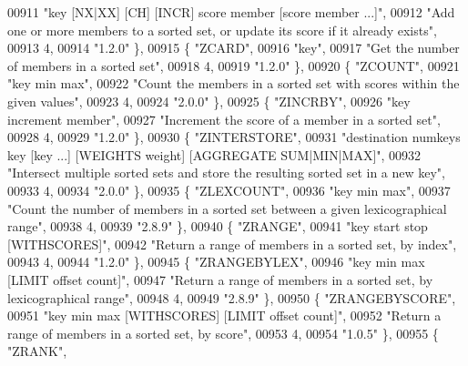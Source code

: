 \begin{DoxyCode}
00911     \textcolor{stringliteral}{"key [NX|XX] [CH] [INCR] score member [score member ...]"},
00912     \textcolor{stringliteral}{"Add one or more members to a sorted set, or update its score if it already exists"},
00913     4,
00914     \textcolor{stringliteral}{"1.2.0"} \},
00915     \{ \textcolor{stringliteral}{"ZCARD"},
00916     \textcolor{stringliteral}{"key"},
00917     \textcolor{stringliteral}{"Get the number of members in a sorted set"},
00918     4,
00919     \textcolor{stringliteral}{"1.2.0"} \},
00920     \{ \textcolor{stringliteral}{"ZCOUNT"},
00921     \textcolor{stringliteral}{"key min max"},
00922     \textcolor{stringliteral}{"Count the members in a sorted set with scores within the given values"},
00923     4,
00924     \textcolor{stringliteral}{"2.0.0"} \},
00925     \{ \textcolor{stringliteral}{"ZINCRBY"},
00926     \textcolor{stringliteral}{"key increment member"},
00927     \textcolor{stringliteral}{"Increment the score of a member in a sorted set"},
00928     4,
00929     \textcolor{stringliteral}{"1.2.0"} \},
00930     \{ \textcolor{stringliteral}{"ZINTERSTORE"},
00931     \textcolor{stringliteral}{"destination numkeys key [key ...] [WEIGHTS weight] [AGGREGATE SUM|MIN|MAX]"},
00932     \textcolor{stringliteral}{"Intersect multiple sorted sets and store the resulting sorted set in a new key"},
00933     4,
00934     \textcolor{stringliteral}{"2.0.0"} \},
00935     \{ \textcolor{stringliteral}{"ZLEXCOUNT"},
00936     \textcolor{stringliteral}{"key min max"},
00937     \textcolor{stringliteral}{"Count the number of members in a sorted set between a given lexicographical range"},
00938     4,
00939     \textcolor{stringliteral}{"2.8.9"} \},
00940     \{ \textcolor{stringliteral}{"ZRANGE"},
00941     \textcolor{stringliteral}{"key start stop [WITHSCORES]"},
00942     \textcolor{stringliteral}{"Return a range of members in a sorted set, by index"},
00943     4,
00944     \textcolor{stringliteral}{"1.2.0"} \},
00945     \{ \textcolor{stringliteral}{"ZRANGEBYLEX"},
00946     \textcolor{stringliteral}{"key min max [LIMIT offset count]"},
00947     \textcolor{stringliteral}{"Return a range of members in a sorted set, by lexicographical range"},
00948     4,
00949     \textcolor{stringliteral}{"2.8.9"} \},
00950     \{ \textcolor{stringliteral}{"ZRANGEBYSCORE"},
00951     \textcolor{stringliteral}{"key min max [WITHSCORES] [LIMIT offset count]"},
00952     \textcolor{stringliteral}{"Return a range of members in a sorted set, by score"},
00953     4,
00954     \textcolor{stringliteral}{"1.0.5"} \},
00955     \{ \textcolor{stringliteral}{"ZRANK"},

\end{DoxyCode}
